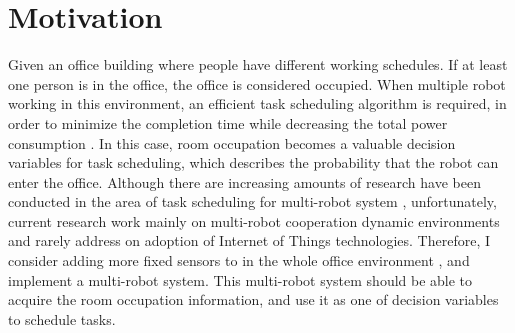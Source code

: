 
\section{Motivation}
Given an office building where people have different working schedules. If at least one person is in the office, the office is considered occupied.
When multiple robot working in this environment, an efficient task scheduling algorithm is required, in order to minimize the completion time while decreasing the total power consumption \cite{Chun12}.
In this case, room occupation becomes a valuable decision variables for task scheduling, which describes the probability that the robot can enter the office.
Although there are increasing amounts of research have been conducted in the area of task scheduling for multi-robot system \cite{Shah7}, unfortunately, current research work mainly on multi-robot cooperation dynamic environments and rarely address on adoption of Internet of Things technologies. 
Therefore, I consider adding more fixed sensors to in the whole office environment \cite{Coltin10}, and implement a multi-robot system. This multi-robot system should be able to acquire the room occupation information, and use it as one of decision variables to schedule tasks. 













